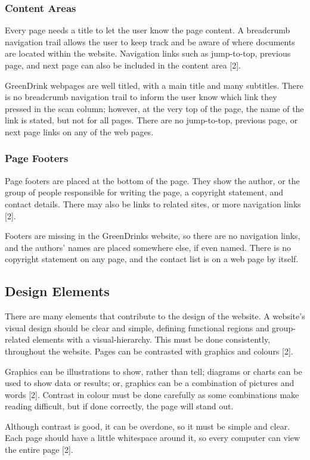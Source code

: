 \documentclass[12pt]{article}
\begin{document}
\subsubsection*{Content Areas}	
Every page needs a title to let the user know the page content. A breadcrumb navigation trail allows the user to keep track and be aware of where documents are located within the website. Navigation links such as jump-to-top, previous page, and next page can also be included in the content area [2].

GreenDrink webpages are well titled, with a main title and many subtitles. There is no breadcrumb navigation trail to inform the user know which link they pressed in the scan column; however, at the very top of the page, the name of the link is stated, but not for all pages. There are no jump-to-top, previous page, or next page links on any of the web pages.

\subsubsection*{Page Footers}	
Page footers are placed at the bottom of the page. They show the author, or the group of people responsible for writing the page, a copyright statement, and contact details. There may also be links to related sites, or more navigation links [2].

Footers are missing in the GreenDrinks website, so there are no navigation links, and the authors’ names are placed somewhere else, if even named. There is no copyright statement on any page, and the contact list is on a web page by itself.
\subsection*{Design Elements}	
There are many elements that contribute to the design of the website. A website’s visual design should be clear and simple, defining functional regions and group-related elements with a visual-hierarchy. This must be done consistently, throughout the website. Pages can be contrasted with graphics and colours [2].
 
Graphics can be illustrations to show, rather than tell; diagrams or charts can be used to show data or results; or, graphics can be a combination of pictures and words [2]. Contrast in colour must be done carefully as some combinations make reading difficult, but if done correctly, the page will stand out. 

Although contrast is good, it can be overdone, so it must be simple and clear. Each page should have a little whitespace around it, so every computer can view the entire page [2].
\end{document}
